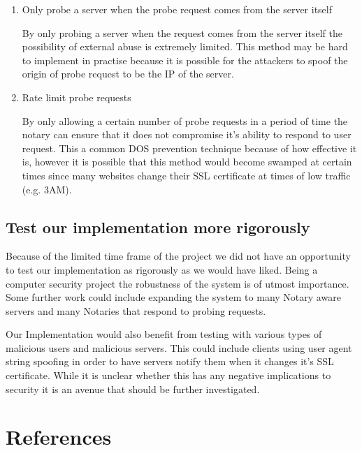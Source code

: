 \documentclass[preprint,review,12pt]{elsarticle}
\begin{document}
\begin{enumerate}
    \item {Only probe a server when the probe request comes from the server itself}

        By only probing a server when the request comes from the server itself
        the possibility of external abuse is extremely limited. This method may
        be hard to implement in practise because it is possible for the
        attackers to spoof the origin of probe request to be the IP of the
        server.

    \item {Rate limit probe requests}

        By only allowing a certain number of probe requests in a period of time
        the notary can ensure that it does not compromise it's ability to
        respond to user request. This a common DOS prevention technique because
        of how effective it is, however it is possible that this method would
        become swamped at certain times since many websites change their SSL
        certificate at times of low traffic (e.g. 3AM).
\end{enumerate}

\subsection{Test our implementation more rigorously}

Because of the limited time frame of the project we did not have an opportunity
to test our implementation as rigorously as we would have liked. Being a
computer security project the robustness of the system is of utmost importance.
Some further work could include expanding the system to many Notary aware
servers and many Notaries that respond to probing requests.

Our Implementation would also benefit from testing with various types of
malicious users and malicious servers. This could include clients using user
agent string spoofing in order to have servers notify them when it changes it's
SSL certificate.  While it is unclear whether this has any negative
implications to security it is an avenue that should be further investigated.

\section{References}
\label{references}
\nocite{*}


\end{document}
